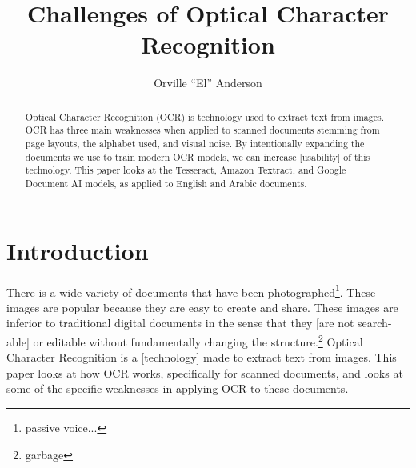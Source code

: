 \documentclass[sigplan,screen,nonacm]{acmart-tagged}
\begin{document}
\title{Challenges of Optical Character Recognition}
\author{Orville ``El'' Anderson}

\begin{abstract}
Optical Character Recognition (OCR) is technology used to extract text from images. OCR has three main weaknesses when applied to scanned documents stemming from page layouts, the alphabet used, and visual noise. By intentionally expanding the documents we use to train modern OCR models, we can increase [usability] of this technology. This paper looks at the Tesseract, Amazon Textract, and Google Document AI models, as applied to English and Arabic documents.
\end{abstract}

\doclicenseThis



\maketitle

\section{Introduction}
\label{sec:introduction}

There is a wide variety of documents that have been photographed\footnote{passive voice...}. These images are popular because they are easy to create and share. These images are inferior to traditional digital documents in the sense that they [are not search-able] or editable without fundamentally changing the structure.\footnote{garbage} Optical Character Recognition is a [technology] made to extract text from images. This paper looks at how OCR works, specifically for scanned documents, and looks at some of the specific weaknesses in applying OCR to these documents.
\end{document}
